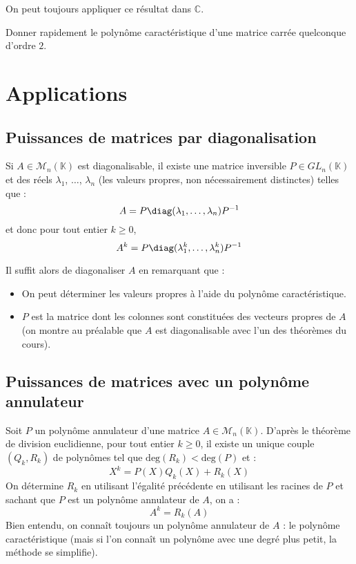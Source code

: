 \documentclass[french,11pt,twoside]{VcCours}
\begin{document}
\begin{Remarque}{} On peut toujours appliquer ce résultat dans $\mathbb{C}$.
\end{Remarque}

\begin{ApplicationDirecte}{} Donner rapidement le polynôme caractéristique d'une matrice carrée quelconque d'ordre $2$.
\end{ApplicationDirecte}

\section{Applications}

\subsection{Puissances de matrices par diagonalisation}

Si $A \in \mathcal{M}_n(\mathbb{K})$ est diagonalisable, il existe une matrice inversible $P \in GL_n(\mathbb{K})$ et des réels $\lambda_1$, $\ldots$, $\lambda_n$ (les valeurs propres, non nécessairement distinctes) telles que :
$$ A = P \diag(\lambda_1, \ldots, \lambda_n) P^{-1}$$
et donc pour tout entier $k \geq 0$,
$$ A^k = P \diag(\lambda_1^k, \ldots, \lambda_n^k) P^{-1}$$

Il suffit alors de diagonaliser $A$ en remarquant que :
\begin{itemize}
\item On peut déterminer les valeurs propres à l'aide du polynôme caractéristique.
\item $P$ est la matrice dont les colonnes sont constituées des vecteurs propres de $A$ (on montre au préalable que $A$ est diagonalisable avec l'un des théorèmes du cours).
\end{itemize}

\subsection{Puissances de matrices avec un polynôme annulateur}
Soit $P$ un polynôme annulateur d'une matrice $A \in \mathcal{M}_n(\mathbb{K})$. D'après le théorème de division euclidienne, pour tout entier $k \geq 0$, il existe un unique couple $(Q_k,R_k)$ de polynômes tel que $\textrm{deg}(R_k) < \textrm{deg}(P)$ et :
$$ X^k = P(X)Q_k(X) + R_k(X)$$
On détermine $R_k$ en utilisant l'égalité précédente en utilisant les racines de $P$ et sachant que $P$ est un polynôme annulateur de $A$, on a :
$$ A^k = R_k(A)$$
Bien entendu, on connaît toujours un polynôme annulateur de $A$ : le polynôme caractéristique (mais si l'on connaît un polynôme avec une degré plus petit, la méthode se simplifie). 
\end{document}
